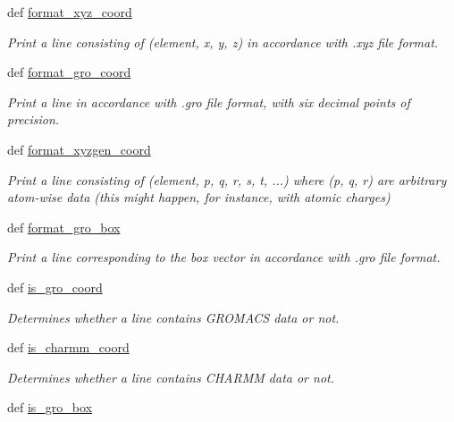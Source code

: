 \begin{DoxyCompactItemize}
def \hyperlink{namespaceforcebalance_1_1molecule_a2eba3cad44138b3b10ea883240888412}{format\-\_\-xyz\-\_\-coord}
\begin{DoxyCompactList}\small\item\em Print a line consisting of (element, x, y, z) in accordance with .xyz file format. \end{DoxyCompactList}\item 
def \hyperlink{namespaceforcebalance_1_1molecule_a41c13064e4285973aa6c49369d3d3390}{format\-\_\-gro\-\_\-coord}
\begin{DoxyCompactList}\small\item\em Print a line in accordance with .gro file format, with six decimal points of precision. \end{DoxyCompactList}\item 
def \hyperlink{namespaceforcebalance_1_1molecule_a4948e4662b8d2c8d515427d1bbb3d01e}{format\-\_\-xyzgen\-\_\-coord}
\begin{DoxyCompactList}\small\item\em Print a line consisting of (element, p, q, r, s, t, ...) where (p, q, r) are arbitrary atom-\/wise data (this might happen, for instance, with atomic charges) \end{DoxyCompactList}\item 
def \hyperlink{namespaceforcebalance_1_1molecule_ae25aa5331b3a2dd0e9d1e184380357db}{format\-\_\-gro\-\_\-box}
\begin{DoxyCompactList}\small\item\em Print a line corresponding to the box vector in accordance with .gro file format. \end{DoxyCompactList}\item 
def \hyperlink{namespaceforcebalance_1_1molecule_a12b7bb398c2fa49a223f258ec7737483}{is\-\_\-gro\-\_\-coord}
\begin{DoxyCompactList}\small\item\em Determines whether a line contains G\-R\-O\-M\-A\-C\-S data or not. \end{DoxyCompactList}\item 
def \hyperlink{namespaceforcebalance_1_1molecule_a838d85848bd817e801d0f5f6502217ef}{is\-\_\-charmm\-\_\-coord}
\begin{DoxyCompactList}\small\item\em Determines whether a line contains C\-H\-A\-R\-M\-M data or not. \end{DoxyCompactList}\item 
def \hyperlink{namespaceforcebalance_1_1molecule_aafc8c924eed4480fed8ddc9c474d3bc1}{is\-\_\-gro\-\_\-box}

\end{DoxyCompactItemize}
